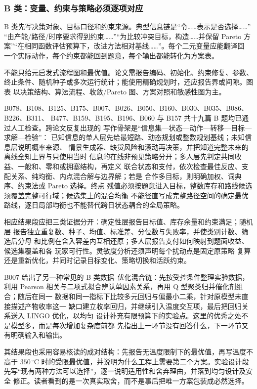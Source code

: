 \subsubsection{B 类：变量、约束与策略必须逐项对应}

B 类先写决策对象、目标口径和约束来源。典型信息链是“令……表示是否选择……”
“由产能/路径/时序要求得到约束……”“为比较冲突目标，构造……并保留 Pareto
方案”“在相同函数评估预算下，改进方法相对基线……”。每个二元变量应能翻译回
一个实际动作，每个约束都能回到题意，每个输出都能转化为方案表。

不能只给元启发式流程图和最优值。论文需报告编码、初始化、约束修复、参数、
终止条件、随机种子或多次运行统计；能使用精确规划时，还应报告界或间隙。图表
以决策结构、算法流程、收敛/Pareto 图、方案对照和敏感性图为主。

B078、B108、B125、B175、B007、B026、B050、B160、B030、B035、B086、B226、B311、
B477、B159、B195、B196、B060 与 B157 共十九篇 B 题均已通过人工检查。跨论文反复出现的
写作骨架是“信息集—状态—动作—转移—目标—求解—检验”：
已知信息的单人层先给最短路、动态规划或整数规划基线；未知信息层说明概率来源、
情景生成器、缺货风险和滚动再决策，并把知道完整未来的离线全知上界与只使用当时
信息的在线非预见策略分开；多人层先判定共同收益、一般和、零和或拥塞结构，再定义
联合状态和支付，依次检查最佳反应、支配关系、纯均衡、内点混合解与边界解；若是
合作多目标，则明确加权、词典序、约束法或 Pareto 选择。终点
残值必须按题意进入目标，整数库存和路线候选须覆盖完整可行域；候选集上的混合均衡
不能径直写成完整路径空间的确定最优路线，逐日局部均衡也不能替代跨日状态耦合的全局策略。

相应结果段应把三类证据分开：确定性层报告目标值、库存余量和约束满足；随机层
报告独立重复数、种子、均值、标准差、分位数与失败率，并使类别计数、筛选后分母
和比例在舍入容差内互相还原；多人层报告支付如何映射到题面收益、候选集覆盖和各
玩家可行性。灵敏度分析还须声明每个扰动点是固定原策略
复算还是重新优化，并同时记录目标变化、策略切换和活跃约束。

B007 给出了另一种常见的 B 类数据--优化混合链：先按受控条件整理实验数据，利用
Pearson 相关与二项式拟合辨认单因素关系，再用 Q 型聚类归并催化剂组合；随后在同一
数据和同一指标下比较多元回归与偏最小二乘，针对原模型未直接描述产物收率这一
缺口建立收率回归，并继续引入温度交互项，最后把回归关系送入 LINGO 优化，以均匀
设计补充有限预算下的实验点。这里的优秀之处不是模型多，而是每次增加复杂度前都
先指出上一环节没有回答什么，下一环节又有明确输入和输出。

其结果段也采用容易核读的成对结构：先报告无温度限制下的最优值，再写温度不高于
$350\,^{\circ}\mathrm{C}$ 时的受限最优值，并说明为什么工程上需要第二个方案。实验设计段
先写“现有两种方法可以选择”，逐一说明适用性和舍弃理由，并落到均匀设计及安全
修正。读者看到的是一次真实取舍，而不是事后把唯一方案包装成必然选择。

